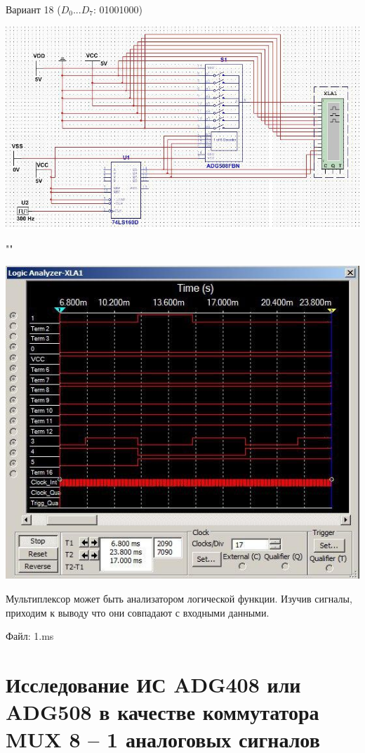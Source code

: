 \documentclass[a4paper,12pt]{article}
\begin{document}
\noindent Вариант 18 ($D_{0}...D_{7}$: 01001000)
\begin{center}
	\includegraphics[scale=0.65]{../screens/1.jpg}
	
	""
	
	\includegraphics[scale=0.68]{../screens/2.jpg}
\end{center}

\noindent Мультиплексор может быть анализатором логической функции. Изучив сигналы, приходим к выводу что они совпадают с входными данными. \newline

\noindent Файл: 1.ms\newline

\section{Исследование ИС ADG408 или ADG508 в качестве коммутатора MUX 8 – 1 аналоговых сигналов}
\end{document}
